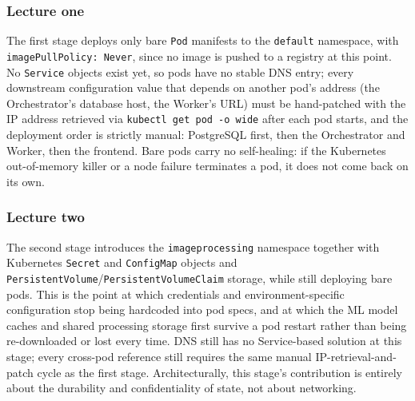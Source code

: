 \documentclass[twoside]{supsistudent}
\begin{document}
\subsubsection{Lecture one}
The first stage deploys only bare \texttt{Pod} manifests to the \texttt{default} namespace, with \\ \texttt{imagePullPolicy: Never}, since no image is pushed to a registry at this point. No \texttt{Service} objects exist yet, so pods have no stable DNS entry; every downstream configuration value that depends on another pod's address (the Orchestrator's database host, the Worker's URL) must be hand-patched with the IP address retrieved via \texttt{kubectl get pod -o wide} after each pod starts, and the deployment order is strictly manual: PostgreSQL first, then the Orchestrator and Worker, then the frontend. Bare pods carry no self-healing: if the Kubernetes out-of-memory killer or a node failure terminates a pod, it does not come back on its own.
\subsubsection{Lecture two}
The second stage introduces the \texttt{imageprocessing} namespace together with Kubernetes \texttt{Secret} and \texttt{ConfigMap} objects and \texttt{PersistentVolume}/\texttt{PersistentVolumeClaim} storage, while still deploying bare pods. This is the point at which credentials and environment-specific configuration stop being hardcoded into pod specs, and at which the ML model caches and shared processing storage first survive a pod restart rather than being re-downloaded or lost every time. DNS still has no Service-based solution at this stage; every cross-pod reference still requires the same manual IP-retrieval-and-patch cycle as the first stage. Architecturally, this stage's contribution is entirely about the durability and confidentiality of state, not about networking.
\end{document}

